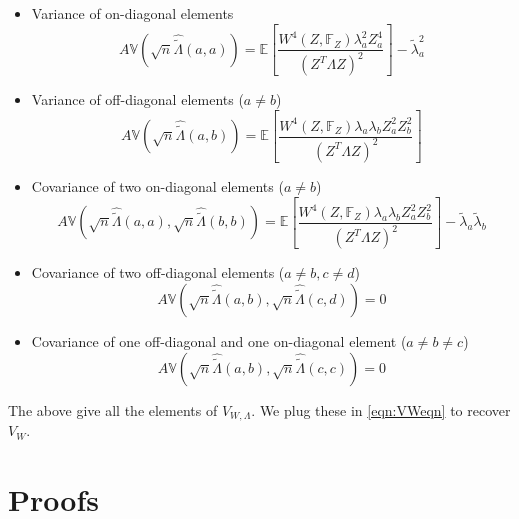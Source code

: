 \documentclass[ejs]{imsart}
\newcommand{\BE}{{\mathbb{E}}}
\newcommand{\BF}{{\mathbb{F}}}
\newcommand{\BV}{{\mathbb{V}}}
\theoremstyle{definition} \newtheorem{Definition}[Theorem]{Definition}
\begin{document}
\begin{itemize}
\item Variance of on-diagonal elements
%
$$ A\BV( \sqrt n \hat {\tilde \Lambda} (a,a) ) = \BE \left[ \frac{ W^4(Z, \BF_Z) \lambda_a^2 Z_a^4}{(Z^T \Lambda Z)^2} \right] - \tilde\lambda_a^2 $$

\item Variance of off-diagonal elements ($a \neq b$)
%
$$ A\BV( \sqrt n \hat {\tilde \Lambda} (a,b) ) = \BE \left[ \frac{W^4 (Z, \BF_Z) \lambda_a \lambda_b Z_a^2 Z_b^2}{(Z^T \Lambda Z)^2} \right] $$

\item Covariance of two on-diagonal elements ($a \neq b$)
%
$$ A\BV(\sqrt n \hat {\tilde \Lambda} (a,a), \sqrt n \hat {\tilde \Lambda} (b,b) )
= \BE \left[ \frac{W^4 (Z, \BF_Z) \lambda_a \lambda_b Z_a^2 Z_b^2}{(Z^T \Lambda Z)^2} \right] - \tilde\lambda_{a} \tilde\lambda_{b} $$

\item Covariance of two off-diagonal elements ($a \neq b, c \neq d$)
%
$$ A\BV(\sqrt n \hat {\tilde \Lambda} (a,b), \sqrt n \hat {\tilde \Lambda} (c,d) ) = 0 $$

\item Covariance of one off-diagonal and one on-diagonal element ($a \neq b \neq c$)
%
$$ A\BV(\sqrt n \hat {\tilde \Lambda} (a,b), \sqrt n \hat {\tilde \Lambda} (c,c) ) = 0 $$
\end{itemize}

\noindent The above give all the elements of $V_{W,\Lambda}$. We plug these in \eqref{eqn:VWeqn} to recover $V_W$.

\section{Proofs}\label{section:appB}
\end{document}
